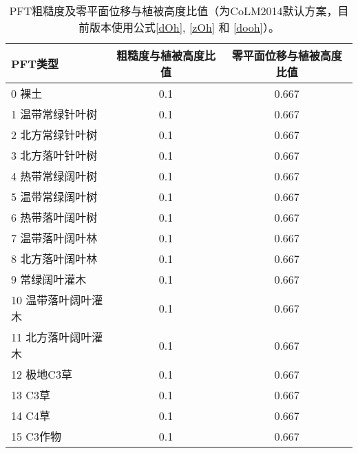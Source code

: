 \begin{table}[]
    \centering
    \caption{PFT粗糙度及零平面位移与植被高度比值（为CoLM2014默认方案，目前版本使用公式\eqref{dOh}, \eqref{zOh} 和 \eqref{dooh}）。}
    \label{tab:PFT粗糙度及零平面位移与植被高度比值}
    \begin{tabular}{@{}lcc@{}}
    \toprule
    PFT类型       & 粗糙度与植被高度比值 & 零平面位移与植被高度比值 \\ \midrule
    0 裸土        & 0.1        & 0.667        \\
    1 温带常绿针叶树   & 0.1        & 0.667        \\
    2 北方常绿针叶树   & 0.1        & 0.667        \\
    3 北方落叶针叶树   & 0.1        & 0.667        \\
    4 热带常绿阔叶树   & 0.1        & 0.667        \\
    5 温带常绿阔叶树   & 0.1        & 0.667        \\
    6 热带落叶阔叶树   & 0.1        & 0.667        \\
    7 温带落叶阔叶林   & 0.1        & 0.667        \\
    8 北方落叶阔叶林   & 0.1        & 0.667        \\
    9 常绿阔叶灌木    & 0.1        & 0.667        \\
    10 温带落叶阔叶灌木 & 0.1        & 0.667        \\
    11 北方落叶阔叶灌木 & 0.1        & 0.667        \\
    12 极地C3草    & 0.1        & 0.667        \\
    13 C3草      & 0.1        & 0.667        \\
    14 C4草      & 0.1        & 0.667        \\
    15 C3作物     & 0.1        & 0.667        \\ \bottomrule
    \end{tabular}
\end{table}



